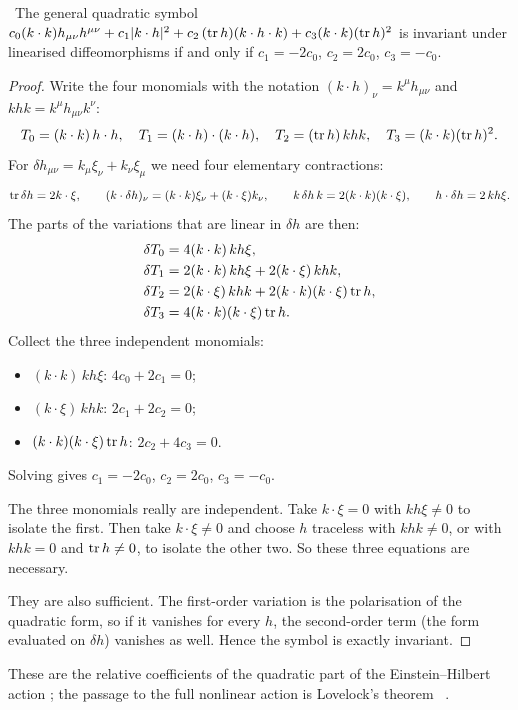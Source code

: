 \begin{theorem}\label{thm:fierzpauli}\ver\
The general quadratic symbol $c_0(k\cdot k)h_{\mu\nu}h^{\mu\nu}+c_1|k\cdot h|^2+c_2\,(\operatorname{tr} h)(k\cdot h\cdot k)+c_3(k\cdot k)(\operatorname{tr} h)^2$ is invariant under linearised diffeomorphisms if and only if $c_1=-2c_0$, $c_2=2c_0$, $c_3=-c_0$.
\end{theorem}
\begin{proof}
Write the four monomials with the notation $(k\cdot h)_\nu=k^\mu h_{\mu\nu}$ and $khk=k^\mu h_{\mu\nu}k^\nu$:
\[
T_0=(k\cdot k)\,h\cdot h,\quad T_1=(k\cdot h)\cdot(k\cdot h),\quad T_2=(\operatorname{tr} h)\,khk,\quad T_3=(k\cdot k)(\operatorname{tr} h)^2 .
\]
For $\delta h_{\mu\nu}=k_\mu\xi_\nu+k_\nu\xi_\mu$ we need four elementary contractions:
\[
\operatorname{tr}\delta h=2k\cdot\xi,\qquad (k\cdot\delta h)_\nu=(k\cdot k)\xi_\nu+(k\cdot\xi)k_\nu,\qquad k\,\delta h\,k=2(k\cdot k)(k\cdot\xi),\qquad h\cdot\delta h=2\,kh\xi .
\]
The parts of the variations that are linear in $\delta h$ are then:
\begin{align*}
\delta T_0&=4(k\cdot k)\,kh\xi,\\
\delta T_1&=2(k\cdot k)\,kh\xi+2(k\cdot\xi)\,khk,\\
\delta T_2&=2(k\cdot\xi)\,khk+2(k\cdot k)(k\cdot\xi)\operatorname{tr} h,\\
\delta T_3&=4(k\cdot k)(k\cdot\xi)\operatorname{tr} h .
\end{align*}
Collect the three independent monomials:
\begin{itemize}[nosep]
\item $(k\cdot k)\,kh\xi$: $4c_0+2c_1=0$;
\item $(k\cdot\xi)\,khk$: $2c_1+2c_2=0$;
\item $(k\cdot k)(k\cdot\xi)\operatorname{tr} h$: $2c_2+4c_3=0$.
\end{itemize}
Solving gives $c_1=-2c_0$, $c_2=2c_0$, $c_3=-c_0$.

The three monomials really are independent. Take $k\cdot\xi=0$ with $kh\xi\ne0$ to isolate the first. Then take $k\cdot\xi\ne0$ and choose $h$ traceless with $khk\ne0$, or with $khk=0$ and $\operatorname{tr} h\ne0$, to isolate the other two. So these three equations are necessary.

They are also sufficient. The first-order variation is the polarisation of the quadratic form, so if it vanishes for every $h$, the second-order term (the form evaluated on $\delta h$) vanishes as well. Hence the symbol is exactly invariant.
\end{proof}


These are the relative coefficients of the quadratic part of the Einstein--Hilbert action \cite{FierzPauli1939}; the passage to the full nonlinear action is Lovelock's theorem \ext\ \cite{Lovelock1971}.

